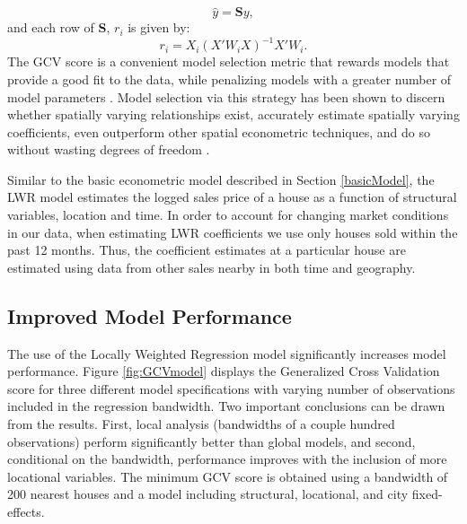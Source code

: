 \documentclass{article}\usepackage[]{graphicx}\usepackage[]{color}
\begin{document}
                   \begin{equation*}
                   \hat{y}=\textbf{S}y,
                   \end{equation*}
                   and each row of \textbf{S}, $r_i$ is given by:
                     \begin{equation*}
                   r_i=X_i(X'W_iX)^{-1}X'W_i.
                   \end{equation*}
The GCV score is a convenient model selection metric that rewards models that provide a good fit to the data, while penalizing models with a greater number of model parameters \citep{Loader1999, McMillen2010}. Model selection via this strategy has been shown to discern whether spatially varying relationships exist, accurately estimate spatially varying coefficients, even outperform other spatial econometric techniques, and do so without wasting degrees of freedom \citep{Paez2011, McMillen2010, McMillen2012}. 

Similar to the basic econometric model described in Section \ref{basicModel}, the LWR model estimates the logged sales price of a house as a function of structural variables, location and time. In order to account for changing market conditions in our data, when estimating LWR coefficients we use only houses sold within the past 12 months. Thus, the coefficient estimates at a particular house are estimated using data from other sales nearby in both time and geography.

\subsection{Improved Model Performance}
The use of the Locally Weighted Regression model significantly increases model performance. Figure \ref{fig:GCVmodel} displays the Generalized Cross Validation score for three different model specifications with varying number of observations included in the regression bandwidth. Two important conclusions can be drawn from the results. First, local analysis (bandwidths of a couple hundred observations) perform significantly better than global models, and second, conditional on the bandwidth, performance improves with the inclusion of more locational variables. The minimum GCV score is obtained using a bandwidth of 200 nearest houses and a model including structural, locational, and city fixed-effects.
\end{document}
